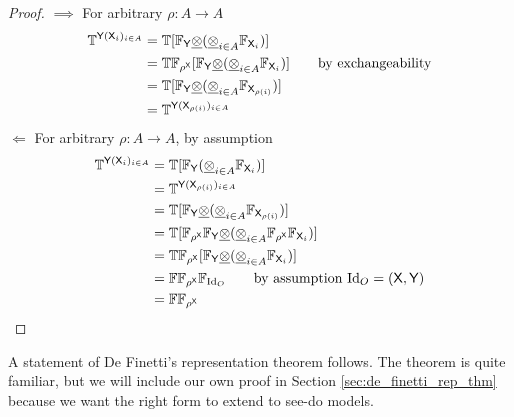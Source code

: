 \begin{proof}
$\implies$
For arbitrary $\rho:A\to A$
\begin{align}
    \mathbb{T}^{\mathsf{Y}(\mathsf{X}_i)_{i\in A}} &= \mathbb{T}[\mathbb{F}_{\mathsf{Y}}\underline{\otimes}(\underline{\otimes}_{i\in A}\mathbb{F}_{\mathsf{X}_i})] \\
                                     &= \mathbb{T}\mathbb{F}_{\rho^{\mathsf{X}}}[\mathbb{F}_{\mathsf{Y}}\underline{\otimes}(\underline{\otimes}_{i\in A}\mathbb{F}_{\mathsf{X}_i})] \qquad\text{by exchangeability}\\
                                     &= \mathbb{T}[\mathbb{F}_{\mathsf{Y}}\underline{\otimes}(\underline{\otimes}_{i\in A}\mathbb{F}_{\mathsf{X}_{\rho(i)}})]\\
                                     &= \mathbb{T}^{\mathsf{Y}(\mathsf{X}_{\rho(i)})_{i\in A}}
\end{align}
$\Leftarrow$
For arbitrary $\rho:A\to A$, by assumption
\begin{align}
\mathbb{T}^{\mathsf{Y}(\mathsf{X}_i)_{i\in A}} &= \mathbb{T}[\mathbb{F}_{\mathsf{Y}}(\underline{\otimes}_{i\in A}\mathbb{F}_{\mathsf{X}_i})]\\
                                     &= \mathbb{T}^{\mathsf{Y}(\mathsf{X}_{\rho(i)})_{i\in A}}\\
                                     &= \mathbb{T}[\mathbb{F}_{\mathsf{Y}}\underline{\otimes}(\underline{\otimes}_{i\in A}\mathbb{F}_{\mathsf{X}_{\rho(i)}})]\\
                                     &= \mathbb{T}[\mathbb{F}_{\rho^{\mathsf{X}}}\mathbb{F}_{\mathsf{Y}}\underline{\otimes}(\underline{\otimes}_{i\in A}\mathbb{F}_{\rho^{\mathsf{X}}}\mathbb{F}_{\mathsf{X}_{i}})]\\
                                     &= \mathbb{T}\mathbb{F}_{\rho^{\mathsf{X}}}[\mathbb{F}_{\mathsf{Y}}\underline{\otimes}(\underline{\otimes}_{i\in A} \mathbb{F}_{\mathsf{X}_i})]\\
                                     &= \mathbb{F}\mathbb{F}_{\rho^{\mathsf{X}}} \mathbb{F}_{\mathrm{Id}_O} \qquad \text{by assumption }\mathrm{Id}_O=(\mathsf{X},\mathsf{Y})\\
                                     &= \mathbb{F}\mathbb{F}_{\rho^{\mathsf{X}}}
\end{align}
\end{proof}

A statement of De Finetti's representation theorem follows. The theorem is quite familiar, but we will include our own proof in Section \ref{sec:de_finetti_rep_thm} because we want the right form to extend to see-do models.

